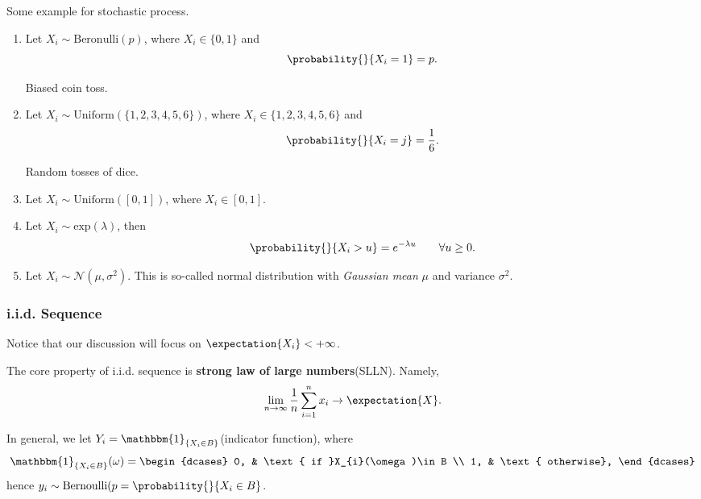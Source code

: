 \begin{eg}
	Some example for stochastic process.
	\begin{enumerate}
		\item Let \(X_i\sim \mathrm{Beronulli}(p)\), where \(X_{i}\in\{0, 1\}\) and
		      \[
			      \probability{}{X_{i} = 1} = p.
		      \]
		      \begin{intuition}
			      Biased coin toss.
		      \end{intuition}
		\item Let \(X_i\sim \mathrm{Uniform}(\{1, 2, 3, 4, 5, 6\})\), where \(X_{i}\in\{1, 2, 3, 4, 5, 6\}\) and
		      \[
			      \probability{}{X_{i} = j} = \frac{1}{6}.
		      \]
		      \begin{intuition}
			      Random tosses of dice.
		      \end{intuition}
		\item Let \(X_i\sim \mathrm{Uniform}(\left[ 0, 1 \right] )\), where \(X_{i}\in\left[ 0, 1 \right] \).
		\item Let \(X_i\sim \mathrm{exp}(\lambda)\), then
		      \[
			      \probability{}{X_{i}>u} = e^{-\lambda u}\qquad \forall u\geq 0.
		      \]
		\item Let \(X_i\sim \mathcal{N}(\mu, \sigma^2)\). This is so-called normal distribution with \emph{Gaussian mean} \(\mu\) and variance \(\sigma^2\).
	\end{enumerate}
\end{eg}

\subsubsection{i.i.d. Sequence}
\begin{remark}
	Notice that our discussion will focus on \(\expectation{X_i} < +\infty \).
\end{remark}

\begin{note}
	The core property of i.i.d. sequence is \textbf{strong law of large numbers}(SLLN). Namely,
	\[
		\lim_{n \to \infty} \frac{1}{n}\sum\limits_{i=1}^{n} x_{i}\to \expectation{X}.
	\]
\end{note}

In general, we let \(Y_{i} = \mathbbm{1}_{\{X_{i}\in B\}}\)(indicator function), where
\[
	\mathbbm{1}_{\{X_{i}\in B\}}(\omega) = \begin{dcases}
		0, & \text{ if }X_{i}(\omega)\in B \\
		1, & \text{ otherwise},
	\end{dcases}
\]
hence \(y_{i}\sim \mathrm{Bernoulli}(p = \probability{}{X_{i}\in B}\).

